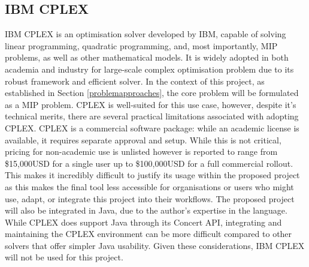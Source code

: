 \subsection{IBM CPLEX}
IBM CPLEX \citep{ibm_cplex} is an optimisation solver developed by IBM, capable of solving linear programming, quadratic programming, and, most importantly, MIP problems, as well as other mathematical models. It is widely adopted in both academia and industry for large-scale complex optimisation problem due to its robust framework and efficient solver.\newline
In the context of this project, as established in Section \ref{problemapproaches}, the core problem will be formulated as a MIP problem. CPLEX is well-suited for this use case, however, despite it's technical merits, there are several practical limitations associated with adopting CPLEX.\newline
CPLEX is a commercial software package: while an academic license is available, it requires separate approval and setup. While this is not critical, pricing for non-academic use is unlisted however is reported to range from \$15,000USD for a single user up to \$100,000USD for a full commercial rollout. This makes it incredibly difficult to justify its usage within the proposed project as this makes the final tool less accessible for organisations or users who might use, adapt, or integrate this project into their workflows. The proposed project will also be integrated in Java, due to the author's expertise in the language. While CPLEX does support Java through its Concert API, integrating and maintaining the CPLEX environment can be more difficult compared to other solvers that offer simpler Java usability. Given these considerations, IBM CPLEX will not be used for this project.
